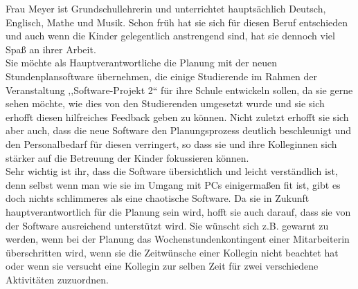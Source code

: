 \documentclass[fontsize=12pt,paper=a4,twoside]{scrartcl}
\begin{document}
Frau Meyer ist Grundschullehrerin und unterrichtet hauptsächlich Deutsch, Englisch, Mathe und Musik. Schon früh hat sie sich für diesen Beruf entschieden und auch wenn die Kinder gelegentlich anstrengend sind, hat sie dennoch viel Spaß an ihrer Arbeit.\\
Sie möchte als Hauptverantwortliche die Planung mit der neuen Stundenplansoftware übernehmen, die einige Studierende im Rahmen der Veranstaltung ,,Software-Projekt 2`` für ihre Schule entwickeln sollen, da sie gerne sehen möchte, wie dies von den Studierenden umgesetzt wurde und sie sich erhofft diesen hilfreiches Feedback geben zu können. Nicht zuletzt erhofft sie sich aber auch, dass die neue Software den Planungsprozess deutlich beschleunigt und den Personalbedarf für diesen verringert, so dass sie und ihre Kolleginnen sich stärker auf die Betreuung der Kinder fokussieren können.  \\
Sehr wichtig ist ihr, dass die Software übersichtlich und leicht verständlich ist, denn selbst wenn man wie sie im Umgang mit PCs einigermaßen fit ist, gibt es doch nichts schlimmeres als eine chaotische Software. Da sie in Zukunft hauptverantwortlich für die Planung sein wird, hofft sie auch darauf, dass sie von der Software ausreichend unterstützt wird. Sie wünscht sich z.B. gewarnt zu werden, wenn bei der Planung das Wochenstundenkontingent einer Mitarbeiterin überschritten wird, wenn sie die Zeitwünsche einer Kollegin nicht beachtet hat oder wenn sie versucht eine Kollegin zur selben Zeit für zwei verschiedene Aktivitäten zuzuordnen. \\
\end{document}
